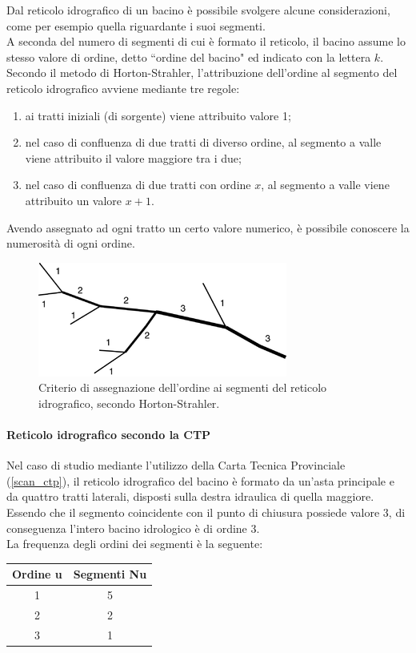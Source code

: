 \noindent Dal reticolo idrografico di un bacino è possibile svolgere alcune considerazioni, come per esempio quella riguardante i suoi segmenti.\\
A seconda del numero di segmenti di cui è formato il reticolo, il bacino assume lo stesso valore di ordine, detto ``ordine del bacino" ed indicato con la lettera $k$.\\
Secondo il metodo di Horton-Strahler, l'attribuzione dell'ordine al segmento del reticolo idrografico avviene mediante tre regole: 
\begin{enumerate}
    \item ai tratti iniziali (di sorgente) viene attribuito valore 1;
    \item nel caso di confluenza di due tratti di diverso ordine, al segmento a valle viene attribuito il valore maggiore tra i due;
    \item nel caso di confluenza di due tratti con ordine $x$, al segmento a valle viene attribuito un valore $x+1$.
\end{enumerate} 
Avendo assegnato ad ogni tratto un certo valore numerico, è possibile conoscere la numerosità di ogni ordine.
\begin{figure}[H]\centering
    \includegraphics[scale=.75]{immagini/ordine_horton.png}
    \caption{Criterio di assegnazione dell'ordine ai segmenti del reticolo idrografico, secondo Horton-Strahler.}
  \label{ordine_horton}
\end{figure}
 
\paragraph{Reticolo idrografico secondo la CTP}
Nel caso di studio mediante l'utilizzo della Carta Tecnica Provinciale (\ref{scan_ctp}), il reticolo idrografico del bacino è formato da un'asta principale e da quattro tratti laterali, disposti sulla destra idraulica di quella maggiore.\\
Essendo che il segmento coincidente con il punto di chiusura possiede valore 3, di conseguenza l'intero bacino idrologico è di ordine 3.\\
La frequenza degli ordini dei segmenti è la seguente:
\begin{table}[H] \centering
    \begin{tabular}{cc}
\toprule
    Ordine u & Segmenti Nu \\
\midrule    
    1        & 5           \\
    2        & 2           \\
    3        & 1           \\
\bottomrule    
\end{tabular}
\end{table}
